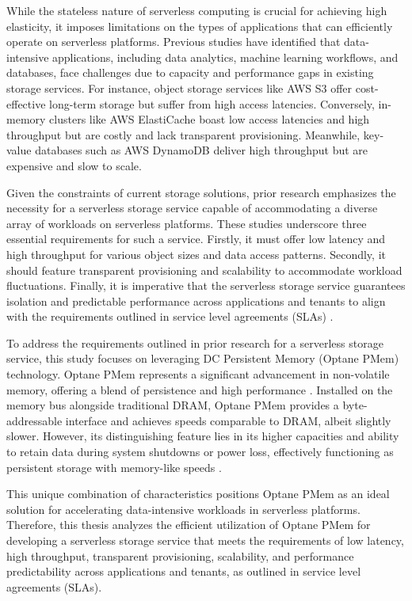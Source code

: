 While the stateless nature of serverless computing is crucial for achieving high elasticity, it imposes limitations on the types of applications that can efficiently operate on serverless platforms. Previous studies \cite{jonas2019cloud,pu2019shuffling,gan2019opensource} have identified that data-intensive applications, including data analytics, machine learning workflows, and databases, face challenges due to capacity and performance gaps in existing storage services. For instance, object storage services like AWS S3 offer cost-effective long-term storage but suffer from high access latencies. Conversely, in-memory clusters like AWS ElastiCache boast low access latencies and high throughput but are costly and lack transparent provisioning. Meanwhile, key-value databases such as AWS DynamoDB deliver high throughput but are expensive and slow to scale.

Given the constraints of current storage solutions, prior research emphasizes the necessity for a serverless storage service capable of accommodating a diverse array of workloads on serverless platforms. These studies underscore three essential requirements for such a service. Firstly, it must offer low latency and high throughput for various object sizes and data access patterns. Secondly, it should feature transparent provisioning and scalability to accommodate workload fluctuations. Finally, it is imperative that the serverless storage service guarantees isolation and predictable performance across applications and tenants to align with the requirements outlined in service level agreements (SLAs) \cite{jonas2019cloud,klimovic2018pocket}.

To address the requirements outlined in prior research for a serverless storage service, this study focuses on leveraging DC Persistent Memory (Optane PMem) technology. Optane PMem represents a significant advancement in non-volatile memory, offering a blend of persistence and high performance \cite{IntelOp15:online}. Installed on the memory bus alongside traditional DRAM, Optane PMem provides a byte-addressable interface and achieves speeds comparable to DRAM, albeit slightly slower. However, its distinguishing feature lies in its higher capacities and ability to retain data during system shutdowns or power loss, effectively functioning as persistent storage with memory-like speeds \cite{yang2020empirical,izraelevitz2019basic}.

This unique combination of characteristics positions Optane PMem as an ideal solution for accelerating data-intensive workloads in serverless platforms. Therefore, this thesis analyzes the efficient utilization of Optane PMem for developing a serverless storage service that meets the requirements of low latency, high throughput, transparent provisioning, scalability, and performance predictability across applications and tenants, as outlined in service level agreements (SLAs).

